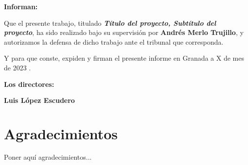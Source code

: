 


\vspace{0.5cm}

\textbf{Informan:}

\vspace{0.5cm}

Que el presente trabajo, titulado \textit{\textbf{Título del proyecto, Subtítulo del proyecto}},
ha sido realizado bajo su supervisión por \textbf{Andrés Merlo Trujillo}, y autorizamos la defensa de dicho trabajo ante el tribunal
que corresponda.

\vspace{0.5cm}

Y para que conste, expiden y firman el presente informe en Granada a X de mes de 2023 .

\vspace{1cm}

\textbf{Los directores:}

\vspace{5cm}

\noindent \textbf{Luis López Escudero}%

\chapter*{Agradecimientos}
\thispagestyle{empty}

       \vspace{1cm}


Poner aquí agradecimientos...

